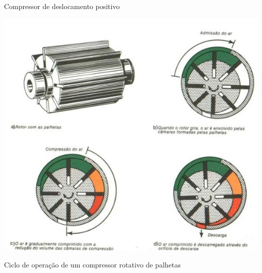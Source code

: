 \begin{frame}{Compressor de deslocamento positivo}

\centering
\includegraphics[width=0.6\linewidth]{Figuras/Ch12/fig3n2}

\medskip
Ciclo de operação de um compressor rotativo de palhetas
\end{frame}


